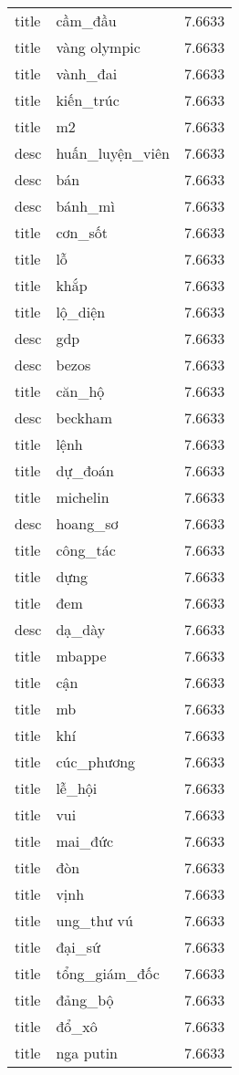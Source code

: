 \documentclass{article}
\begin{document}
\begin{tabular}{lll}
title & cầm\_đầu & 7.6633\\
title & vàng olympic & 7.6633\\
title & vành\_đai & 7.6633\\
title & kiến\_trúc & 7.6633\\
title & m2 & 7.6633\\
desc & huấn\_luyện\_viên & 7.6633\\
desc & bán & 7.6633\\
desc & bánh\_mì & 7.6633\\
title & cơn\_sốt & 7.6633\\
title & lỗ & 7.6633\\
title & khắp & 7.6633\\
title & lộ\_diện & 7.6633\\
desc & gdp & 7.6633\\
desc & bezos & 7.6633\\
title & căn\_hộ & 7.6633\\
desc & beckham & 7.6633\\
title & lệnh & 7.6633\\
title & dự\_đoán & 7.6633\\
title & michelin & 7.6633\\
desc & hoang\_sơ & 7.6633\\
title & công\_tác & 7.6633\\
title & dựng & 7.6633\\
title & đem & 7.6633\\
desc & dạ\_dày & 7.6633\\
title & mbappe & 7.6633\\
title & cận & 7.6633\\
title & mb & 7.6633\\
title & khí & 7.6633\\
title & cúc\_phương & 7.6633\\
title & lễ\_hội & 7.6633\\
title & vui & 7.6633\\
title & mai\_đức & 7.6633\\
title & đòn & 7.6633\\
title & vịnh & 7.6633\\
title & ung\_thư vú & 7.6633\\
title & đại\_sứ & 7.6633\\
title & tổng\_giám\_đốc & 7.6633\\
title & đảng\_bộ & 7.6633\\
title & đổ\_xô & 7.6633\\
title & nga putin & 7.6633\\

\end{tabular}
\end{document}
